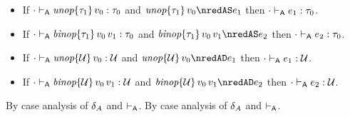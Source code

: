 \begin{lemma}\label{A-delta-type-preservation}\leavevmode
  \begin{itemize}
    \item
      If\/ ${\cdot} \vdash_{\mathsf{A}} \textit{unop}{\{\tau_1\}}\,v_0 : \tau_0$
      and\/ $\eunopt{\stype_1}{\svalue_0} \nredAS \sexpr_1$
      then\/ ${\cdot} \vdash_{\mathsf{A}} e_1 : \tau_0$.
    \item
      If\/ ${\cdot} \vdash_{\mathsf{A}} \textit{binop}{\{\tau_1\}}\,v_0\,v_1 : \tau_0$
      and\/ $\ebinopt{\stype_1}{\svalue_0}{\svalue_1} \nredAS \sexpr_2$
      then\/ ${\cdot} \vdash_{\mathsf{A}} e_2 : \tau_0$.
    \item
      If\/ ${\cdot} \vdash_{\mathsf{A}} \textit{unop}{\{{\mathcal U}\}}\,v_0 : {\mathcal U}$
      and\/ $\eunopt{\tdyn}{\svalue_0} \nredAD \sexpr_1$
      then\/ ${\cdot} \vdash_{\mathsf{A}} e_1 : {\mathcal U}$.
    \item
      If\/ ${\cdot} \vdash_{\mathsf{A}} \textit{binop}{\{{\mathcal U}\}}\,v_0\,v_1 : {\mathcal U}$
      and\/ $ \ebinopt{\tdyn}{\svalue_0}{\svalue_1} \nredAD \sexpr_2$
      then\/ ${\cdot} \vdash_{\mathsf{A}} e_2 : {\mathcal U}$.
  \end{itemize}
\end{lemma}{
  \newcommand{\shortpf}{By case analysis of $\sdeltaA$ and $\sWTA$.}
\begin{lamportproof*}
  \shortpf
\mainproof
  \shortpf


\end{lamportproof*}}
